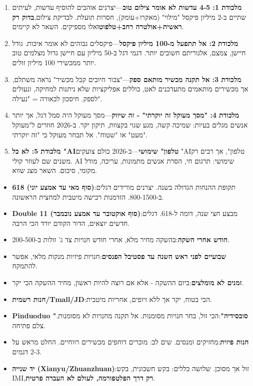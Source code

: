 
\begin{enumerate}
  \item \textbf{מלכודת 1: 4-5 עדשות לא אומר צילום טוב}—יצרנים אוהבים להוסיף עדשות, לעיתים שתיים ב-2 מיליון פיקסל "מילוי" (מאקרו+עומק), חסרות תועלת. לבדיקת צילום,\textbf{בדוק רק ראשית+אולטרה רחב+טלפוטו}אלו מספיקים. השאר לא קיימים.
  \item \textbf{מלכודת 2: אל תתפעל מ-100 מיליון פיקסל}—פיקסלים גבוהים לא אומר איכות. גודל חיישן, צמצם, אלגוריתם חשובים יותר. דגמי דגל ב-50 מיליון עם חיישן גדול מצלמים טוב יותר ממכשירי 100 מיליון זולים.
  \item \textbf{מלכודת 3: אל תקנה מכשיר מותאם ספק}—"צבור חיובים קבל מכשיר" נראה משתלם, אך מכשירים מותאמים מתעדכנים לאט, כוללים אפליקציות שלא ניתנות למחיקה, ונעולים לספק. חיסכון לכאורה = "נעילה".
  \item \textbf{מלכודת 4: "מסך מעוקל זה יוקרתי" - זה שיווק}—מסך מעוקל היה סמל דגל, אך יותר אנשים מגלים בעיות: שמיכה קשה, מגע שגוי בקצוות, תיקון יקר. ב-2026 חוזרים ל"מעוקל מעט" או "שטוח". אל תבחר מעוקל כי "זה יוקרתי".
  \item \textbf{מלכודת 5: לא כל "AIטלפון" שימושי}—ב-2026 כולם צועקים "AIטלפון", אך רבים רק משנים שם לעוזר קולי. AI שימושי: תרגום חי, הסרת אנשים מתמונות, עריכה, מודל מקומי, סיכום. השאר מצג שווא.
\end{enumerate}


\begin{itemize}
  \item \textbf{618 (סוף מאי עד אמצע יוני)}:תקופת ההנחות הגדולה בשנה. יצרנים מורידים דגלים ב-800-1500. הזדמנות רכישה מיטבית למחצית הראשונה.
  \item \textbf{Double 11 (סוף אוקטובר עד אמצע נובמבר)}:מבצע חצי שנה, דומה ל-618. דגלים חדשים יוצאים, הדור הקודם יורד הכי הרבה.
  \item \textbf{חודש אחרי השקה}:בהשקה מחיר מלא, אחרי חודש חנויות צד ג' זולות ב-200-500.
  \item \textbf{שבועיים לפני ראש השנה עד פסטיבל הפנסים}:חנויות פיזיות מנקות מלאי, אפשר להתמקח.
  \item \textbf{זמנים לא מומלצים}:ביום ההשקה - אלא אם רוצה להיות ראשון, מחיר ההשקה הכי יקר.
\end{itemize}


\begin{itemize}
  \item \textbf{חנות רשמית/Tmall/JD}:הכי בטוח, יקר אך ללא זיופים, אחריות מיטבית.
  \item \textbf{Pinduoduo "סובסידיה"}:הכי זול, בחר חנויות מסומנות. אל תקנה מחנויות לא מסומנות. צלם פתיחה.
  \item \textbf{חנות פיזית}:מחזיקים ומנסים. שים לב: מוכרים דוחפים מכשירים רווחיים. החלט מראש על 2-3 דגמים.
  \item \textbf{יד שנייה (Xianyu/Zhuanzhuan)}:זול אך מסוכן. שלושה כללים: בקש חשבונית, בקש IMI,\textbf{רק דרך הפלטפורמה, לעולם לא העברה פרטית}.
\end{itemize}

